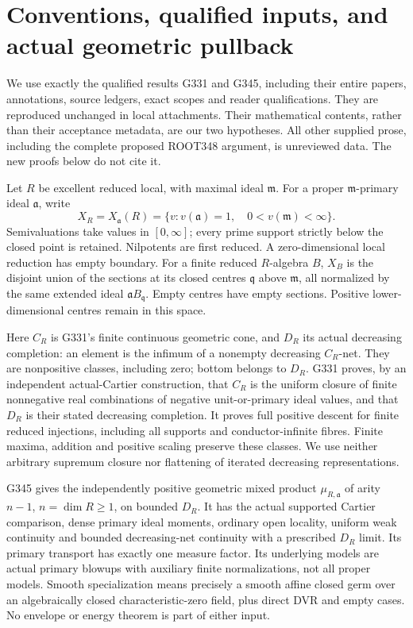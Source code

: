 \section{Conventions, qualified inputs, and actual geometric pullback}
\label{sec:pull}
We use exactly the qualified results G331 and G345, including their entire
papers, annotations, source ledgers, exact scopes and reader qualifications.
They are reproduced unchanged in local attachments. Their mathematical
contents, rather than their acceptance metadata, are our two hypotheses.
All other supplied prose, including the complete proposed ROOT348 argument,
is unreviewed data. The new proofs below do not cite it.

Let \(R\) be excellent reduced local, with maximal ideal \(\mathfrak m\).
For a proper \(\mathfrak m\)-primary ideal \(\mathfrak a\), write
\[
 X_R=X_{\mathfrak a}(R)=\{v: v(\mathfrak a)=1,\quad
                    0<v(\mathfrak m)<\infty\}.
\]
Semivaluations take values in \([0,\infty]\); every prime support strictly
below the closed point is retained. Nilpotents are first reduced. A
zero-dimensional local reduction has empty boundary.
For a finite reduced \(R\)-algebra \(B\), \(X_B\) is the disjoint union
of the sections at its closed centres \(\mathfrak q\) above \(\mathfrak m\),
all normalized by the same extended ideal \(\mathfrak a B_{\mathfrak q}\).
Empty centres have empty sections. Positive lower-dimensional centres
remain in this space.

Here \(C_R\) is G331's finite continuous geometric cone, and \(D_R\) its
actual decreasing completion: an element is the infimum of a nonempty
decreasing \(C_R\)-net. They are nonpositive classes, including zero;
bottom belongs to \(D_R\). G331 proves, by an independent actual-Cartier
construction, that \(C_R\) is the uniform closure of finite nonnegative
real combinations of negative unit-or-primary ideal values, and that
\(D_R\) is their stated decreasing completion. It proves full positive
descent for finite reduced injections, including all supports and
conductor-infinite fibres. Finite maxima, addition and positive scaling
preserve these classes. We use neither arbitrary supremum closure nor
flattening of iterated decreasing representations.

G345 gives the independently positive geometric mixed product
\(\mu_{R,\mathfrak a}\) of arity \(n-1\), \(n=\dim R\geq1\), on bounded
\(D_R\). It has the actual supported Cartier comparison, dense primary
ideal moments, ordinary open locality, uniform weak continuity and
bounded decreasing-net continuity with a prescribed \(D_R\) limit.
Its primary transport has exactly one measure factor. Its underlying
models are actual primary blowups with auxiliary finite normalizations,
not all proper models. Smooth specialization means precisely a smooth
affine closed germ over an algebraically closed characteristic-zero
field, plus direct DVR and empty cases. No envelope or energy theorem
is part of either input.

